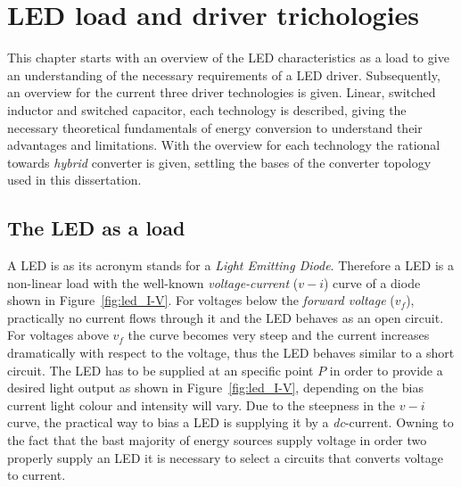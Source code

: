 \chapter{LED load and driver trichologies }
%

This chapter starts with an overview of the LED characteristics as a load to give an understanding of the necessary requirements of a LED driver. Subsequently, an overview for the current three driver technologies is given. Linear, switched inductor and switched capacitor, each technology is described, giving the necessary theoretical fundamentals of energy conversion to understand their advantages and limitations.  With the overview for each technology the rational towards \emph{hybrid} converter is given, settling the bases of the converter topology used in this dissertation.

\section{The LED as a load}
\label{sc:LED_load}
A LED is as its acronym stands for a \emph{Light Emitting Diode}. Therefore a LED is a non-linear load with the well-known \emph{voltage-current} ($v-i$) curve of a diode shown in Figure~\ref{fig:led_I-V}. For voltages below the \emph{forward voltage} ($v_{f}$), practically no current flows through it and the LED behaves as an open circuit. For voltages above $v_{f}$ the curve becomes very steep and the current increases dramatically with respect to the voltage, thus the LED behaves similar to a short circuit. The LED has to be supplied at an specific point $P$ in order to provide a desired light output as shown in Figure~\ref{fig:led_I-V}, depending on the bias current light colour and intensity will vary. Due to the steepness in the $v-i$ curve, the practical way to bias a LED is supplying it by a \emph{dc}-current. Owning to the fact that the bast majority of energy sources supply voltage in order two properly supply an LED  it is necessary to select a circuits that converts voltage to current.

